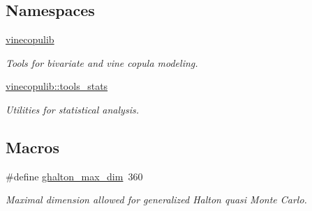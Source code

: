 \subsection*{Namespaces}
\begin{DoxyCompactItemize}
\item 
 \hyperlink{namespacevinecopulib}{vinecopulib}
\begin{DoxyCompactList}\small\item\em Tools for bivariate and vine copula modeling. \end{DoxyCompactList}\item 
 \hyperlink{namespacevinecopulib_1_1tools__stats}{vinecopulib\+::tools\+\_\+stats}
\begin{DoxyCompactList}\small\item\em Utilities for statistical analysis. \end{DoxyCompactList}\end{DoxyCompactItemize}
\subsection*{Macros}
\begin{DoxyCompactItemize}
\item 
\#define \hyperlink{tools__stats_8ipp_a311ce58bd6b4dd3b194e1e113917dab1}{ghalton\+\_\+max\+\_\+dim}~360\hypertarget{tools__stats_8ipp_a311ce58bd6b4dd3b194e1e113917dab1}{}\label{tools__stats_8ipp_a311ce58bd6b4dd3b194e1e113917dab1}

\begin{DoxyCompactList}\small\item\em Maximal dimension allowed for generalized Halton quasi Monte Carlo. \end{DoxyCompactList}\end{DoxyCompactItemize}
